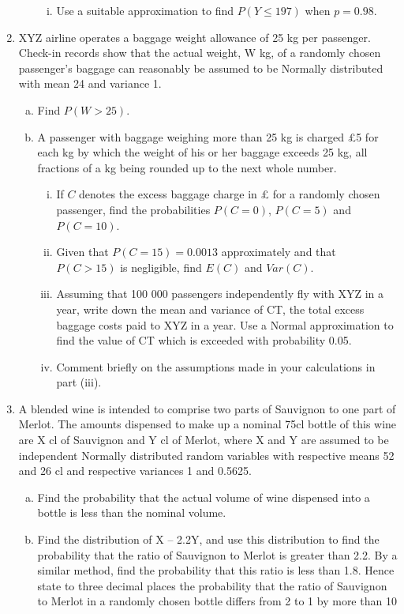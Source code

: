\documentclass[a4paper,12pt]{article}
\begin{document}
\begin{enumerate}
\begin{enumerate}[(a)]
\begin{enumerate}[(i)]
\item Use a suitable approximation to find $P(Y \leq 197)$ when $p = 0.98$.
\end{enumerate}
\end{enumerate}

\item XYZ airline operates a baggage weight allowance of 25 kg per passenger. Check-in records show that the actual weight, W kg, of a randomly chosen passenger's baggage can reasonably be assumed to be Normally distributed with mean 24 and variance 1.
\begin{enumerate}[(a)]
\item Find $P(W > 25)$.

\item  A passenger with baggage weighing more than 25 kg is charged £5 for each kg by which the weight of his or her baggage exceeds 25 kg, all fractions of a kg being rounded up to the next whole number.

\begin{enumerate}[(i)]
\item If $C$ denotes the excess baggage charge in £ for a randomly chosen passenger, find the probabilities $P(C = 0)$, $P(C = 5)$ and $P(C = 10)$.
\item Given that $P(C = 15) = 0.0013$ approximately and that $P(C > 15)$ is negligible, find $E(C)$ and $Var(C)$.
\item Assuming that 100 000 passengers independently fly with XYZ in a year, write down the mean and variance of CT, the total excess baggage costs paid to XYZ in a year. Use a Normal approximation to find the value of CT which is exceeded with probability 0.05.
\item Comment briefly on the assumptions made in your calculations in part (iii).
\end{enumerate}
\end{enumerate}
\item A blended wine is intended to comprise two parts of Sauvignon to one part of Merlot.
The amounts dispensed to make up a nominal 75cl bottle of this wine are X cl of
Sauvignon and Y cl of Merlot, where X and Y are assumed to be independent Normally
distributed random variables with respective means 52 and 26 cl and respective
variances 1 and 0.5625.
\begin{enumerate}[(a)]
\item Find the probability that the actual volume of wine dispensed into a bottle is
less than the nominal volume.
\item  Find the distribution of X – 2.2Y, and use this distribution to find the
probability that the ratio of Sauvignon to Merlot is greater than 2.2. By a
similar method, find the probability that this ratio is less than 1.8. Hence state
to three decimal places the probability that the ratio of Sauvignon to Merlot in
a randomly chosen bottle differs from 2 to 1 by more than 10%


\end{enumerate}
\end{enumerate}
\end{document}
